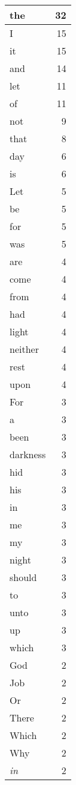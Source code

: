 \begin{center}
\begin{longtable}{l|r}
\hline \hline
\endlastfoot
the & 32 \\ \hline
I & 15 \\ \hline
it & 15 \\ \hline
and & 14 \\ \hline
let & 11 \\ \hline
of & 11 \\ \hline
not & 9 \\ \hline
that & 8 \\ \hline
day & 6 \\ \hline
is & 6 \\ \hline
Let & 5 \\ \hline
be & 5 \\ \hline
for & 5 \\ \hline
was & 5 \\ \hline
are & 4 \\ \hline
come & 4 \\ \hline
from & 4 \\ \hline
had & 4 \\ \hline
light & 4 \\ \hline
neither & 4 \\ \hline
rest & 4 \\ \hline
upon & 4 \\ \hline
For & 3 \\ \hline
a & 3 \\ \hline
been & 3 \\ \hline
darkness & 3 \\ \hline
hid & 3 \\ \hline
his & 3 \\ \hline
in & 3 \\ \hline
me & 3 \\ \hline
my & 3 \\ \hline
night & 3 \\ \hline
should & 3 \\ \hline
to & 3 \\ \hline
unto & 3 \\ \hline
up & 3 \\ \hline
which & 3 \\ \hline
God & 2 \\ \hline
Job & 2 \\ \hline
Or & 2 \\ \hline
There & 2 \\ \hline
Which & 2 \\ \hline
Why & 2 \\ \hline
\emph{in} & 2 \\ \hline

\end{longtable}
\end{center}
